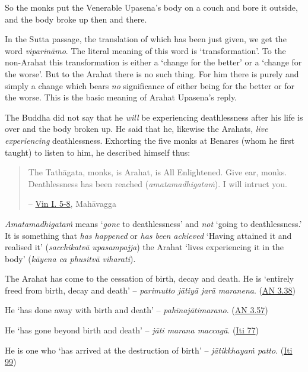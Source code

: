 So the monks put the Venerable Upasena's body on a couch and bore it outside, and the body broke up then and there.

In the Sutta passage, the translation of which has been just given, we get the word \textit{viparināmo}. The literal meaning of this word is `transformation'. To the non-Arahat this transformation is either a `change for the better' or a `change for the worse'. But to the Arahat there is no such thing. For him there is purely and simply a change which bears \emph{no} significance of either being for the better or for the worse. This is the basic meaning of Arahat Upasena's reply.

The Buddha did not say that he \emph{will} be experiencing deathlessness after his life is over and the body broken up. He said that he, likewise the Arahats, \emph{live experiencing} deathlessness. Exhorting the five monks at Benares (whom he first taught) to listen to him, he described himself thus:

\begin{quote}
The Tathāgata, monks, is Arahat, is All Enlightened. Give ear, monks. Deathlessness has been reached (\textit{amatamadhigataṁ}). I will intruct you.

 -- \href{https://suttacentral.net/pli-tv-kd1/en/brahmali}{Vin I. 5-8}, Mahāvagga
\end{quote}

\textit{Amatamadhigataṁ} means `\emph{gone} to deathlessness' and \emph{not} `going to deathlessness.' It is something that \emph{has happened} or \emph{has been achieved} `Having attained it and realised it' (\textit{sacchikatvā upasampajja}) the Arahat `lives experiencing it in the body' (\textit{kāyena ca phusitvā viharati}).

The Arahat has come to the cessation of birth, decay and death. He is `entirely freed from birth, decay and death' -- \textit{parimutto jātiyā jarā maranena}. (\href{https://suttacentral.net/an3.38/en/bodhi}{AN 3.38})

He `has done away with birth and death' -- \textit{pahīnajātimarano}. (\href{https://suttacentral.net/an3.57/en/bodhi}{AN 3.57})

He `has gone beyond birth and death' -- \textit{jāti marana maccagā}. (\href{https://suttacentral.net/iti77/en/sujato}{Iti 77})

He is one who `has arrived at the destruction of birth' -- \textit{jātikkhayaṁ patto}. (\href{https://suttacentral.net/iti99/en/sujato}{Iti 99})

